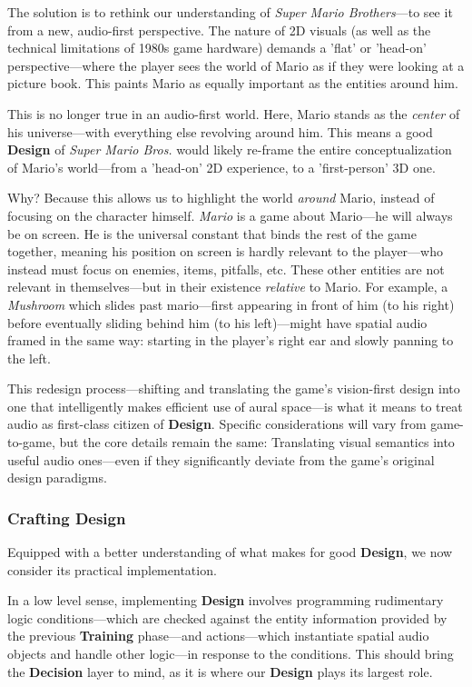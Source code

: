 \documentclass{report}
\newcommand{\train}{\textbf{Training}\xspace}
\newcommand{\design}{\textbf{Design}\xspace}
\newcommand{\decision}{\textbf{Decision}\xspace}
\begin{document}
The solution is to rethink our understanding of \emph{Super Mario Brothers}---to see it from a new, audio-first perspective. The nature of 2D visuals (as well as the technical limitations of 1980s game hardware) demands a 'flat' or 'head-on' perspective---where the player sees the world of Mario as if they were looking at a picture book. This paints Mario as equally important as the entities around him. 

This is no longer true in an audio-first world. Here, Mario stands as the \emph{center} of his universe---with everything else revolving around him. This means a good \design of \emph{Super Mario Bros.} would likely re-frame the entire conceptualization of Mario's world---from a 'head-on' 2D experience, to a 'first-person' 3D one. 

Why? Because this allows us to highlight the world \emph{around} Mario, instead of focusing on the character himself. \emph{Mario} is a game about Mario---he will always be on screen. He is the universal constant that binds the rest of the game together, meaning his position on screen is hardly relevant to the player---who instead must focus on enemies, items, pitfalls, etc. These other entities are not relevant in themselves---but in their existence \emph{relative} to Mario. For example, a \emph{Mushroom} which slides past mario---first appearing in front of him (to his right) before eventually sliding behind him (to his left)---might have spatial audio framed in the same way: starting in the player's right ear and slowly panning to the left. 

This redesign process---shifting and translating the game's vision-first design into one that intelligently makes efficient use of aural space---is what it means to treat audio as first-class citizen of \design. Specific considerations will vary from game-to-game, but the core details remain the same: Translating visual semantics into useful audio ones---even if they significantly deviate from the game's original design paradigms. 

\subsubsection{Crafting Design}

Equipped with a better understanding of what makes for good \design, we now consider its practical implementation. 

In a low level sense, implementing \design involves programming rudimentary logic conditions---which are checked against the entity information provided by the previous \train phase---and actions---which instantiate spatial audio objects and handle other logic---in response to the conditions. This should bring the \decision layer to mind, as it is where our \design plays its largest role. 
\end{document}
